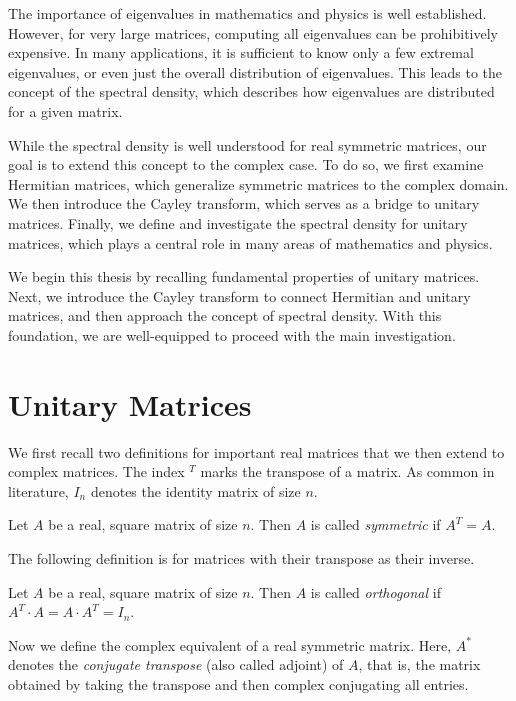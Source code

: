 The importance of eigenvalues in mathematics and physics is well established.
However, for very large matrices, computing all eigenvalues can be prohibitively expensive.
In many applications, it is sufficient to know only a few extremal eigenvalues,
or even just the overall distribution of eigenvalues.
This leads to the concept of the spectral density,
which describes how eigenvalues are distributed for a given matrix.

While the spectral density is well understood for real symmetric matrices,
our goal is to extend this concept to the complex case.
To do so, we first examine Hermitian matrices, which generalize symmetric matrices to the complex domain.
We then introduce the Cayley transform, which serves as a bridge to unitary matrices.
Finally, we define and investigate the spectral density for unitary matrices,
which plays a central role in many areas of mathematics and physics.

We begin this thesis by recalling fundamental properties of unitary matrices.
Next, we introduce the Cayley transform to connect Hermitian and unitary matrices,
and then approach the concept of spectral density.
With this foundation, we are well-equipped to proceed with the main investigation.

\section{Unitary Matrices}

We first recall two definitions for important real matrices that we then extend to complex matrices.
The index $^T$ marks the transpose of a matrix.
As common in literature, $I_n$ denotes the identity matrix of size $n$.

\begin{definition}
    Let $A$ be a real, square matrix of size $n$.
    Then $A$ is called \emph{symmetric} if $A^T = A$.
\end{definition}

The following definition is for matrices with their transpose as their inverse.

\begin{definition}
    Let $A$ be a real, square matrix of size $n$.
    Then $A$ is called \emph{orthogonal} if $A^T \cdot A = A \cdot A^T = I_n$.
\end{definition}

Now we define the complex equivalent of a real symmetric matrix.
Here, $A^*$ denotes the \emph{conjugate transpose} (also called adjoint) of $A$, that is,
the matrix obtained by taking the transpose and then complex conjugating all entries.

